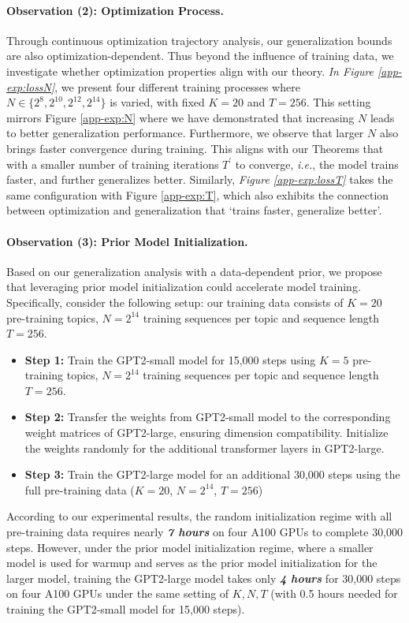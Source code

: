 \paragraph{Observation (2): Optimization Process.} Through continuous optimization trajectory analysis, our generalization bounds are also optimization-dependent. Thus beyond the influence of training data, we investigate whether optimization properties align with our theory. \textit{In Figure \ref{app-exp:lossN}}, we present four different training processes where $N \in  \{2^{8},2^{10},2^{12},2^{14}\}$ is varied, with fixed $K=20$ and $T=256$. This setting mirrors Figure \ref{app-exp:N} where we have demonstrated that increasing $N$ leads to better generalization performance. Furthermore, we observe that larger $N$ also brings faster convergence during training. This aligns with our Theorems that with a smaller number of training iterations $T^\prime$ to converge, \textit{i.e.}, the model trains faster, and further generalizes better. Similarly, \textit{Figure \ref{app-exp:lossT}} takes the same configuration with Figure \ref{app-exp:T}, which also exhibits the connection between optimization and generalization that `trains faster, generalize better'. 

\paragraph{Observation (3): Prior Model Initialization.} Based on our generalization analysis with a data-dependent prior, we propose that leveraging prior model initialization could accelerate model training. Specifically, consider the following setup: our training data consists of $K=20$ pre-training topics, $N=2^{14}$ training sequences per topic and sequence length $T=256$. 
\begin{itemize}
    \item \textbf{Step 1:} Train the GPT2-small model for 15,000 steps using $K=5$ pre-training topics, $N=2^{14}$ training sequences per topic and sequence length $T=256$.
    \item \textbf{Step 2:} Transfer the weights from GPT2-small model to the corresponding weight matrices of GPT2-large, ensuring dimension compatibility. Initialize the weights randomly for the additional transformer layers in GPT2-large.
    \item \textbf{Step 3:} Train the GPT2-large model for an additional 30,000 steps using the full pre-training data ($K=20$, $N=2^{14}$, $T=256$)
\end{itemize}
According to our experimental results, the random initialization regime with all pre-training data requires nearly \textit{\textbf{7 hours}} on four A100 GPUs to complete 30,000 steps. However, under the prior model initialization regime, where a smaller model is used for warmup and serves as the prior model initialization for the larger model, training the GPT2-large model takes only \textbf{\textit{4 hours}} for 30,000 steps on four A100 GPUs under the same setting of $K,N,T$ (with 0.5 hours needed for training the GPT2-small model for 15,000 steps).

